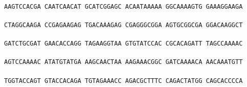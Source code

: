 \documentclass[11pt,twoside,reqno,a4paper]{article}
\begin{document}
 \\
\texttt{AAGTCCACGA	CAATCAACAT	GCATCGGAGC	ACAATAAAAA	GGCAAAAGTG	GAAAGGAAGA	\\
\hspace*{1\charwidth}\hspace*{1\charwidth}\hspace*{1\charwidth}\hspace*{1\charwidth}\hspace*{1\charwidth}\hspace*{1\charwidth}\\
CTAGGCAAGA	CCGAGAAGAG	TGACAAAGAG	CGAGGGCGGA	AGTGCGGCGA	GGACAAGGCT	\\
\hspace*{1\charwidth}\hspace*{1\charwidth}\hspace*{1\charwidth}\hspace*{1\charwidth}\hspace*{1\charwidth}\hspace*{1\charwidth}\\
GATCTGCGAT	GAACACCAGG	TAGAAGGTAA	GTGTATCCAC	CGCACAGATT	TAGCCAAAAC	\\
\hspace*{1\charwidth}\hspace*{1\charwidth}\hspace*{1\charwidth}\hspace*{1\charwidth}\hspace*{1\charwidth}\hspace*{1\charwidth}\\
AGTCCAAAAC	ATATGTATGA	AAGCAACTAA	AAGAAACGGC	GATCAAAACA	AACAAATGTT	\\
\hspace*{1\charwidth}\hspace*{1\charwidth}\hspace*{1\charwidth}\hspace*{1\charwidth}\hspace*{1\charwidth}\hspace*{1\charwidth}\\
TGGTACCAGT	GTACCACAGA	TGTAGAAACC	AGACGCTTTC	CAGACTATGG	CAGCACCCCA	\\
\hspace*{1\charwidth}\hspace*{1\charwidth}\hspace*{1\charwidth}\hspace*{1\charwidth}\hspace*{1\charwidth}\hspace*{1\charwidth}\\
}
\end{document}
